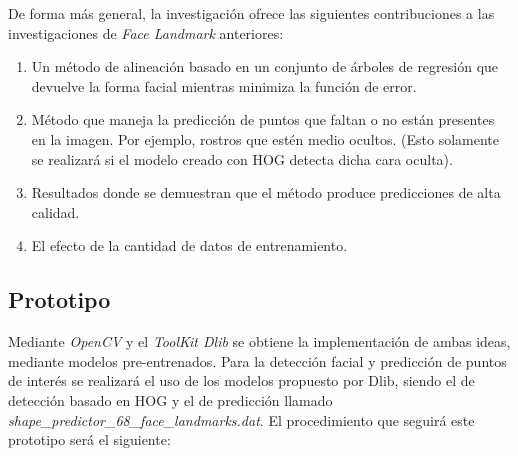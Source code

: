 De forma más general, la investigación ofrece las siguientes contribuciones a las investigaciones de \textit{Face Landmark} anteriores:

\begin{enumerate}
	\vspace{-0.2cm}
	\item Un método de alineación basado en un conjunto de árboles de regresión que devuelve la forma facial mientras minimiza la función de error.
	\vspace{-0.2cm}
	\item Método que maneja la predicción de puntos que faltan o no están presentes en la imagen. Por ejemplo, rostros que estén medio ocultos. (Esto solamente se realizará si el modelo creado con HOG detecta dicha cara oculta).
	\vspace{-0.2cm}
	\item Resultados donde se demuestran que el método produce predicciones de alta calidad.
	\vspace{-0.2cm}
	\item El efecto de la cantidad de datos de entrenamiento.
\end{enumerate}

\vspace{-0.8cm}
\subsection*{Prototipo}
\vspace{-0.5cm}
Mediante \textit{OpenCV} y el \textit{ToolKit Dlib} se obtiene la implementación de ambas ideas, mediante modelos pre-entrenados. Para la detección facial y predicción de puntos de interés se realizará el uso de los modelos propuesto por Dlib, siendo el de detección basado en HOG y el de predicción llamado \textit{shape\_predictor\_68\_face\_landmarks.dat}. El procedimiento que seguirá este prototipo será el siguiente:

